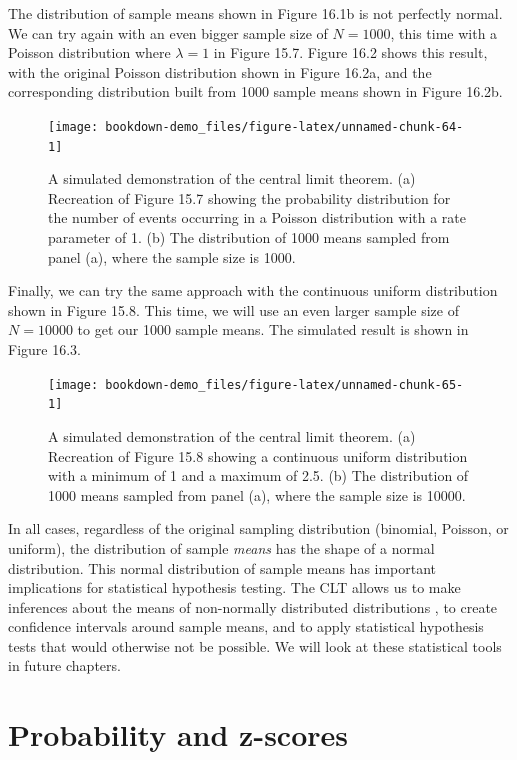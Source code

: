\documentclass[
]{scrbook}
\begin{document}
The distribution of sample means shown in Figure 16.1b is not perfectly normal.
We can try again with an even bigger sample size of \(N = 1000\), this time with a Poisson distribution where \(\lambda = 1\) in Figure 15.7.
Figure 16.2 shows this result, with the original Poisson distribution shown in Figure 16.2a, and the corresponding distribution built from 1000 sample means shown in Figure 16.2b.

\begin{figure}
\texttt{[image: bookdown-demo\_files/figure-latex/unnamed-chunk-64-1]} \caption{A simulated demonstration of the central limit theorem. (a) Recreation of Figure 15.7 showing the probability distribution for the number of events occurring in a Poisson distribution with a rate parameter of 1. (b) The distribution of 1000 means sampled from panel (a), where the sample size is 1000.}\label{fig:unnamed-chunk-64}
\end{figure}

Finally, we can try the same approach with the continuous uniform distribution shown in Figure 15.8.
This time, we will use an even larger sample size of \(N = 10000\) to get our 1000 sample means.
The simulated result is shown in Figure 16.3.

\begin{figure}
\texttt{[image: bookdown-demo\_files/figure-latex/unnamed-chunk-65-1]} \caption{A simulated demonstration of the central limit theorem. (a) Recreation of Figure 15.8 showing a continuous uniform distribution with a minimum of 1 and a maximum of 2.5. (b) The distribution of 1000 means sampled from panel (a), where the sample size is 10000.}\label{fig:unnamed-chunk-65}
\end{figure}

In all cases, regardless of the original sampling distribution (binomial, Poisson, or uniform), the distribution of sample \emph{means} has the shape of a normal distribution.
This normal distribution of sample means has important implications for statistical hypothesis testing.
The CLT allows us to make inferences about the means of non-normally distributed distributions \citep{Sokal1995}, to create confidence intervals around sample means, and to apply statistical hypothesis tests that would otherwise not be possible.
We will look at these statistical tools in future chapters.

\hypertarget{probability-and-z-scores}{%
\section{Probability and z-scores}\label{probability-and-z-scores}}
\end{document}
